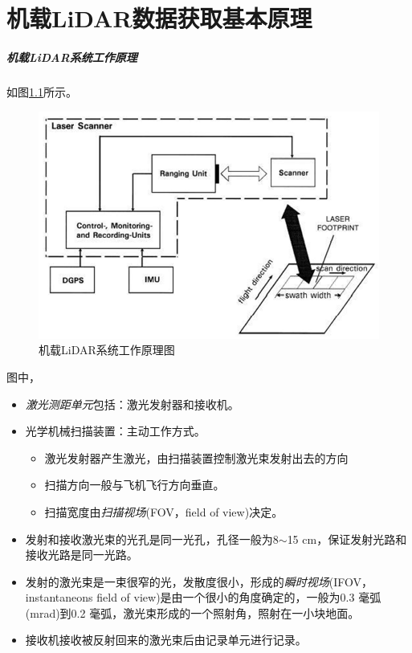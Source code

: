 
\chapter{机载LiDAR数据获取基本原理} %

\paragraph{机载LiDAR系统工作原理}如图\ref{fig:机载LiDAR系统工作原理图}所示。
\begin{figure}[htbp]
	\centering
	\includegraphics[width=0.7\linewidth]{figure/Chapter3/机载LiDAR系统工作原理图}
	\caption{机载LiDAR系统工作原理图}
	\label{fig:机载LiDAR系统工作原理图}
\end{figure}

图中，
\begin{itemize}
	\item \textit{激光测距单元}包括：激光发射器和接收机。
	\item 光学机械扫描装置：主动工作方式。
		\begin{itemize}
			\item 激光发射器产生激光，由扫描装置控制激光束发射出去的方向
			\item 扫描方向一般与飞机飞行方向垂直。
			\item 扫描宽度由\textit{扫描视场}(FOV，field of view)决定。
		\end{itemize}
	\item 发射和接收激光束的光孔是同一光孔，孔径一般为8$ \sim $15 cm，保证发射光路和接收光路是同一光路。
	\item 发射的激光束是一束很窄的光，发散度很小，形成的\textit{瞬时视场}(IFOV，instantaneons field of view)是由一个很小的角度确定的，一般为0.3 毫弧(mrad)到0.2 毫弧，激光束形成的一个照射角，照射在一小块地面。
	\item 接收机接收被反射回来的激光束后由记录单元进行记录。
\end{itemize}

